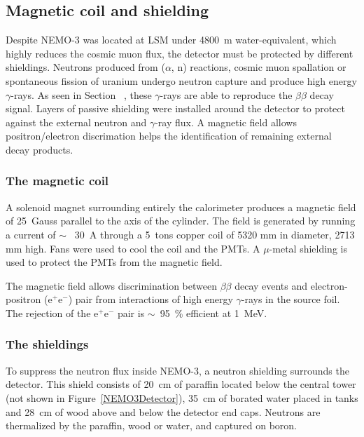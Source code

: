 \documentclass[main.tex]{subfiles}
\begin{document}
\FloatBarrier


\subsection{Magnetic coil and shielding}


\NI Despite NEMO-3 was located at LSM under 4800~m water-equivalent, which highly reduces the cosmic muon flux, the detector must be protected by different shieldings. Neutrons produced from ($\alpha$, n) reactions, cosmic muon spallation or spontaneous fission of uranium undergo neutron capture and produce high energy $\gamma$-rays. As seen in Section~ , these $\gamma$-rays are able to reproduce the $\beta\beta$ decay signal. Layers of passive shielding were installed around the detector to protect against the external neutron and $\gamma$-ray flux. A magnetic field allows positron/electron discrimation helps the identification of remaining external decay products.


\subsubsection{The magnetic coil}


\NI A solenoid magnet surrounding entirely the calorimeter produces a magnetic field of 25~Gauss parallel to the axis of the cylinder. The field is generated by running a current of $\sim$~ 30~A through a 5~tons copper coil of 5320 mm in diameter, 2713 mm high. Fans were used to cool the coil and the PMTs. A $\mu$-metal shielding is used to protect the PMTs from the magnetic field. 


\bigskip


\NI The magnetic field allows discrimination between $\beta\beta$ decay events and electron-positron (e$^+$e$^-$) pair from interactions of high energy $\gamma$-rays in the source foil. The rejection of the e$^+$e$^-$ pair is $\sim$~95~\% efficient at 1~MeV. 

\bigskip


\subsubsection{The shieldings}


\NI To suppress the neutron flux inside NEMO-3, a neutron shielding surrounds the detector. This shield consists of 20~cm of paraffin located below the central tower (not shown in Figure~\ref{NEMO3Detector}), 35~cm of borated water placed in tanks and 28~cm of wood above and below the detector end caps. Neutrons are thermalized by the paraffin, wood or water, and captured on boron. 
\end{document}
